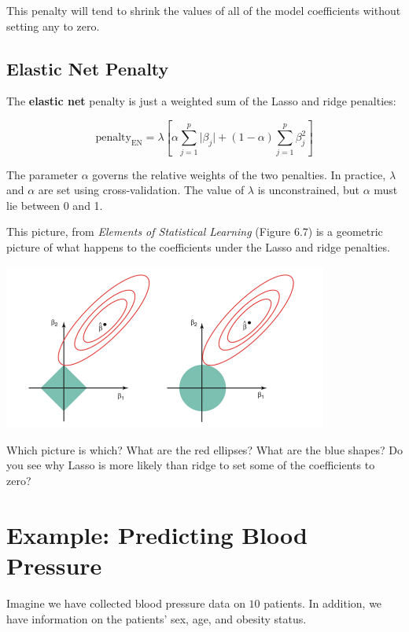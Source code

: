 This penalty will tend to shrink the values of all of the model coefficients without setting any to zero. 

\subsection{Elastic Net Penalty}

The \textbf{elastic net} penalty is just a weighted sum of the Lasso and ridge penalties:

$$ \text{penalty}_\text{EN} = \lambda \left[ \alpha \sum_{j=1}^p \vert \beta_j \vert + (1-\alpha)  \sum_{j=1}^p \beta_j^2 \right] $$

The parameter $\alpha$ governs the relative weights of the two penalties. In practice, $\lambda$ and $\alpha$ are set using cross-validation. The value of $\lambda$ is unconstrained, but $\alpha$ must lie between 0 and 1. 

\begin{question}{}
This picture, from \emph{Elements of Statistical Learning} (Figure 6.7) is a geometric picture of what happens to the coefficients under the Lasso and ridge penalties.
\begin{center}
\includegraphics[width=0.8\textwidth]{img/esl-lasso-ridge-6.7.png}
\end{center}
Which picture is which? What are the red ellipses? What are the blue shapes? Do you see why Lasso is more likely than ridge to set some of the coefficients to zero?
\end{question}


\section{Example: Predicting Blood Pressure}

Imagine we have collected blood pressure data on $10$ patients. In addition, we have information on the patients' sex, age, and obesity status. 

